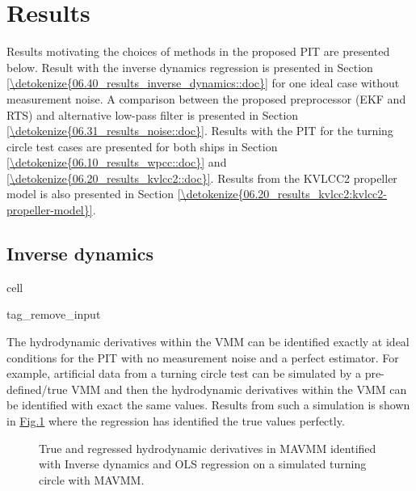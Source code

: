 \documentclass[review]{elsarticle}
\begin{document}
\section{Results}
\label{\detokenize{06.01_results:results}}\label{\detokenize{06.01_results:id1}}\label{\detokenize{06.01_results::doc}}
Results motivating the choices of methods in the proposed PIT are presented below. Result with the inverse dynamics regression is presented in Section \ref{\detokenize{06.40_results_inverse_dynamics::doc}} for one ideal case without measurement noise. A comparison between the proposed preprocessor (EKF and RTS) and alternative low-pass filter is presented in Section \ref{\detokenize{06.31_results_noise::doc}}. Results with the PIT for the turning circle test cases are presented for both ships in Section \ref{\detokenize{06.10_results_wpcc::doc}} and \ref{\detokenize{06.20_results_kvlcc2::doc}}. Results from the KVLCC2 propeller model is also presented in Section  \ref{\detokenize{06.20_results_kvlcc2:kvlcc2-propeller-model}}.


\subsection{Inverse dynamics}
\label{\detokenize{06.40_results_inverse_dynamics:inverse-dynamics}}\label{\detokenize{06.40_results_inverse_dynamics::doc}}
\begin{sphinxuseclass}{cell}
\begin{sphinxuseclass}{tag_remove_input}
\end{sphinxuseclass}
\end{sphinxuseclass}
The hydrodynamic derivatives within the VMM can be identified exactly at ideal conditions for the PIT with no measurement noise and a perfect estimator. For example, artificial data from a turning circle test can be simulated by a pre-defined/true VMM and then the hydrodynamic derivatives within the VMM can be identified with exact the same values. Results from such a simulation is shown in \hyperref[\detokenize{06.40_results_inverse_dynamics:fig-bar-parameters}]{Fig.\@ \ref{\detokenize{06.40_results_inverse_dynamics:fig-bar-parameters}}} where the regression has identified the true values perfectly.

\begin{figure}[H]
\centering
\capstart

\noindent{}
\caption{True and regressed hydrodynamic derivatives in MAVMM identified with Inverse dynamics and OLS regression on a simulated turning circle with MAVMM.}\label{\detokenize{06.40_results_inverse_dynamics:fig-bar-parameters}}\end{figure}
\end{document}
